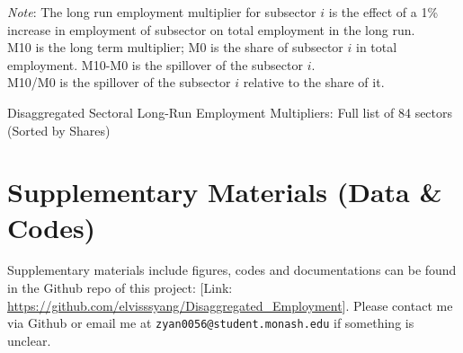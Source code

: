 \documentclass{monashthesis}
\begin{document}
\begin{table}[ht]
\begin{tablenotes}
      \item \emph{Note}: The long run employment multiplier for subsector $i$ is the effect of a 1\% increase in employment of subsector on total employment in the long run. \\
      M10 is the long term multiplier; M0 is the share of subsector $i$ in total employment.
      M10-M0 is the spillover of the subsector $i$. \\
      M10/M0 is the spillover of the subsector $i$ relative to the share of it.
\end{tablenotes}
\caption{Disaggregated Sectoral Long-Run Employment Multipliers: Full list of 84 sectors (Sorted by Shares)}
  \label{dis:emp}
\end{table}

\hypertarget{supplementary-materials-data-codes}{%
\chapter{Supplementary Materials (Data \& Codes)}\label{supplementary-materials-data-codes}}

Supplementary materials include figures, codes and documentations can be found in the Github repo of this project: {[}Link: \url{https://github.com/elvisssyang/Disaggregated_Employment}{]}. Please contact me via Github or email me at \texttt{zyan0056@student.monash.edu} if something is unclear.

\printbibliography[heading=bibintoc]
\end{document}
